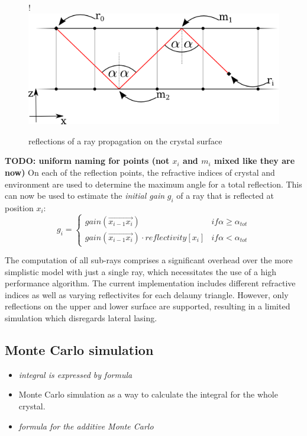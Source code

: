 \begin{figure}
  \centerline{
     {!} {\includegraphics{./graphics/reflections_1.png}}
  }
  \caption{reflections of a ray propagation on the crystal surface}
  \label{graphic:reflections_2D}
\end{figure}


\textbf{TODO: uniform naming for points (not $x_i$ and $m_i$ mixed like they are
now)}
On each of the reflection points, the refractive indices of crystal and
environment are used to determine the maximum angle for a total reflection. This
can now be used to estimate the \emph{initial gain} $g_i$ of a ray that is
reflected at position $x_i$:
\[
  g_i = 
  \begin{cases}
    gain(\overrightarrow{x_{i-1}x_i}) & if \alpha \ge \alpha_{tot}  \\
    gain(\overrightarrow{x_{i-1}x_i}) \cdot reflectivity[x_i] & if \alpha < \alpha_{tot}   
  \end{cases}
\]

The computation of all sub-rays comprises a significant overhead over the more
simplistic model with just a single ray, which necessitates the use of a high
performance algorithm.  The current implementation includes different refractive
indices as well as varying reflectivites for each delauny triangle. However,
only reflections on the upper and lower surface are supported, resulting in a
limited simulation which disregards lateral lasing. 


\subsection{Monte Carlo simulation}
\label{subsec:monteCarlo}

\begin{itemize}

  \item \textit{integral is expressed by formula} \cite[Daniel's Thesis]{ASE2010}

  \item Monte Carlo simulation as a way to calculate the integral for the whole
    crystal.

  \item \textit{formula for the additive Monte Carlo}

\end{itemize}






